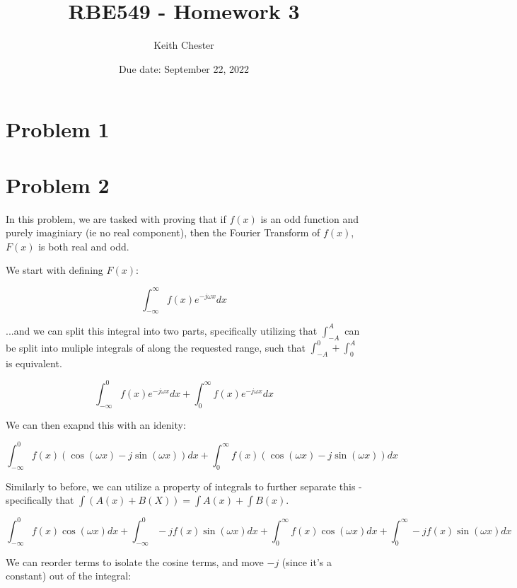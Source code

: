 \documentclass{article}
\title{RBE549 - Homework 3}
\author{Keith Chester}
\date{Due date: September 22, 2022}
\begin{document}
\maketitle

\section*{Problem 1}


\section*{Problem 2}

In this problem, we are tasked with proving that if $f(x)$ is an odd function and purely imaginiary (ie no real component), then the Fourier Transform of $f(x)$, $F(x)$ is both real and odd.

We start with defining $F(x)$:

\begin{equation}
    \int_{-\infty}^{\infty} f(x)e^{-j \omega x} dx
\end{equation}

\noindent ...and we can split this integral into two parts, specifically utilizing that $\int_{-A}^{A}$ can be split into muliple integrals of along the requested range, such that $\int_{-A}^0 + \int_0^A$ is equivalent.

\begin{equation}
    \int_{-\infty}^{0} f(x)e^{-j \omega x} dx + \int_{0}^{\infty} f(x)e^{-j \omega x} dx
\end{equation}

\noindent We can then exapnd this with an idenity:

\begin{equation}
    \int_{-\infty}^{0} f(x)(\cos(\omega x) - j\sin(\omega x)) dx + \int_{0}^{\infty} f(x)(\cos(\omega x) - j\sin(\omega x)) dx
\end{equation}

\noindent Similarly to before, we can utilize a property of integrals to further separate this - specifically that $\int (A(x)+B(X)) = \int A(x) + \int B(x)$.

\begin{equation}
    \int_{-\infty}^{0} f(x)\cos(\omega x) dx + \int_{-\infty}^{0} -j f(x) \sin(\omega x) dx + \int_{0}^{\infty} f(x)\cos(\omega x) dx + \int_{0}^{\infty} -j f(x) \sin(\omega x) dx
\end{equation}

\noindent We can reorder terms to isolate the cosine terms, and move $-j$ (since it's a constant) out of the integral:
\end{document}
